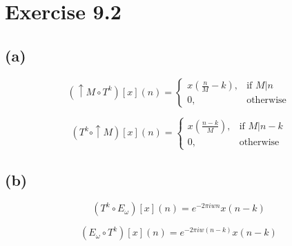 \documentclass[12pt,a4paper]{scrartcl}
\begin{document}
\newpage
\section*{Exercise 9.2}
\subsection*{(a)}

\begin{equation}
(\uparrow M \circ T^k)[x](n) =
\begin{cases}
  x(\frac{n}{M} - k), & \mbox{if } M\vert n\\
  0, & \mbox{otherwise}
\end{cases}
\end{equation}

\begin{equation}
(T^k \circ \uparrow M)[x](n) =
\begin{cases}
  x(\frac{n-k}{M}), & \mbox{if } M\vert n-k\\
  0, & \mbox{otherwise}
\end{cases}
\end{equation}


\subsection*{(b)}
\begin{equation}
(T^k \circ E_\omega)[x](n) = e^{-2\pi iwn} x(n-k)
\end{equation}

\begin{equation}
( E_\omega \circ T^k)[x](n) =e^{-2\pi iw(n-k)}x(n-k)
\end{equation}

\\
\end{document}
